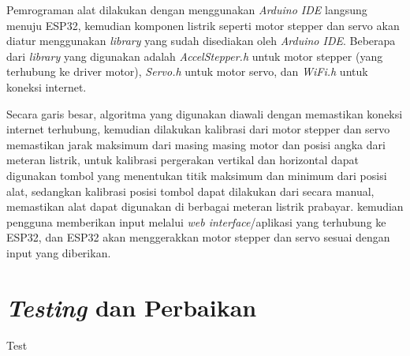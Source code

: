 Pemrograman alat dilakukan dengan menggunakan \textit{Arduino IDE} langsung menuju ESP32, kemudian komponen listrik
seperti motor stepper dan servo akan diatur menggunakan \textit{library} yang sudah disediakan oleh \textit{Arduino IDE}.
Beberapa dari \textit{library} yang digunakan adalah \textit{AccelStepper.h} untuk motor stepper (yang terhubung ke driver motor), 
\textit{Servo.h} untuk motor servo, dan \textit{WiFi.h} untuk koneksi internet. 

Secara garis besar,
algoritma yang digunakan diawali dengan memastikan koneksi internet terhubung, kemudian dilakukan
kalibrasi dari motor stepper dan servo memastikan jarak maksimum dari masing masing motor dan posisi
angka dari meteran listrik, untuk kalibrasi pergerakan vertikal dan horizontal dapat digunakan tombol yang menentukan titik
maksimum dan minimum dari posisi alat, sedangkan kalibrasi posisi tombol dapat dilakukan dari  secara manual,
memastikan alat dapat digunakan di berbagai meteran listrik prabayar.
kemudian pengguna memberikan input melalui \textit{web interface}/aplikasi yang terhubung ke ESP32,
dan ESP32 akan menggerakkan motor stepper dan servo sesuai dengan input yang diberikan.

\section{\textit{Testing} dan Perbaikan}

Test